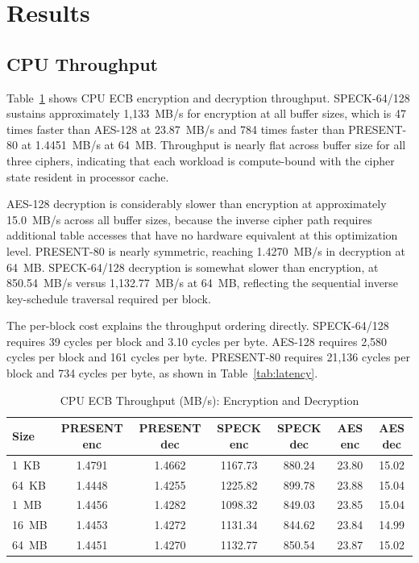 \documentclass[conference]{IEEEtran}
\begin{document}
\section{Results}

\subsection{CPU Throughput}

Table~\ref{tab:cpu} shows CPU ECB encryption and decryption throughput. SPECK-64/128 sustains
approximately 1,133~MB/s for encryption at all buffer sizes, which is 47 times faster than AES-128 at
23.87~MB/s and 784 times faster than PRESENT-80 at 1.4451~MB/s at 64~MB. Throughput is nearly flat
across buffer size for all three ciphers, indicating that each workload is compute-bound with the
cipher state resident in processor cache.

AES-128 decryption is considerably slower than encryption at approximately 15.0~MB/s across all
buffer sizes, because the inverse cipher path requires additional table accesses that have no hardware
equivalent at this optimization level. PRESENT-80 is nearly symmetric, reaching 1.4270~MB/s in
decryption at 64~MB. SPECK-64/128 decryption is somewhat slower than encryption, at 850.54~MB/s
versus 1,132.77~MB/s at 64~MB, reflecting the sequential inverse key-schedule traversal required
per block.

The per-block cost explains the throughput ordering directly. SPECK-64/128 requires 39 cycles per
block and 3.10 cycles per byte. AES-128 requires 2,580 cycles per block and 161 cycles per byte.
PRESENT-80 requires 21,136 cycles per block and 734 cycles per byte, as shown in
Table~\ref{tab:latency}.

\begin{table}[t]
\caption{CPU ECB Throughput (MB/s): Encryption and Decryption}
\label{tab:cpu}
\begin{center}
\begin{tabular}{|l|c|c|c|c|c|c|}
\hline
\textbf{Size} & \textbf{PRESENT enc} & \textbf{PRESENT dec} & \textbf{SPECK enc}
  & \textbf{SPECK dec} & \textbf{AES enc} & \textbf{AES dec} \\
\hline
1~KB  & 1.4791 & 1.4662 & 1167.73 & 880.24 & 23.80 & 15.02 \\
64~KB & 1.4448 & 1.4255 & 1225.82 & 899.78 & 23.88 & 15.04 \\
1~MB  & 1.4456 & 1.4282 & 1098.32 & 849.03 & 23.85 & 15.04 \\
16~MB & 1.4453 & 1.4272 & 1131.34 & 844.62 & 23.84 & 14.99 \\
64~MB & 1.4451 & 1.4270 & 1132.77 & 850.54 & 23.87 & 15.02 \\
\hline
\end{tabular}
\end{center}
\end{table}
\end{document}

